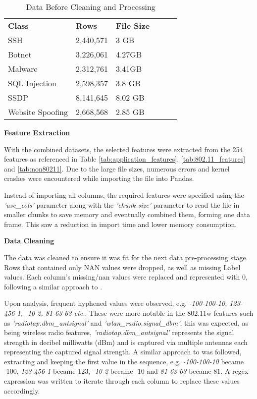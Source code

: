 \begin{table}[H]
\centering
\begin{tabular}{llllll}
\cline{1-3}
\textbf{Class}  & \textbf{Rows} & \textbf{File Size} &  &  &  \\ \cline{1-3}
SSH              & 2,440,571     & 3 GB               &  &  &  \\
Botnet           & 3,226,061     & 4.27GB             &  &  &  \\
Malware          & 2,312,761     & 3.41GB             &  &  &  \\
SQL Injection    & 2,598,357     & 3.8 GB             &  &  &  \\
SSDP             & 8,141,645     & 8.02 GB            &  &  &  \\
Website Spoofing & 2,668,568     & 2.85 GB            &  &  &  \\ \cline{1-3}
\end{tabular}
\caption{Data Before Cleaning and Processing}
\label{tab:full_data}
\end{table}

\medskip

\textbf{Feature Extraction}

\smallskip
With the combined datasets, the selected features were extracted from the 254 features as referenced in Table \ref{tab:application_features}, \ref{tab:802.11_features} and \ref{tab:non80211}. Due to the large file sizes, numerous errors and kernel crashes were encountered while importing the file into Pandas. 

Instead of importing all columns, the required features were specified using the \textit{'use\_cols'} parameter along with the \textit{'chunk size'} parameter to read the file in smaller chunks to save memory and eventually combined them, forming one data frame. This saw a reduction in import time and lower memory consumption.

\medskip
\textbf{Data Cleaning}

\smallskip
The data was cleaned to ensure it was fit for the next data pre-processing stage. Rows that contained only NAN values were dropped, as well as missing Label values. Each column's missing/nan values were replaced and represented with 0, following a similar approach to \textcite{s22155633}.

\smallskip
Upon analysis, frequent hyphened values were observed, e.g. \textit{-100-100-10, 123-456-1, -10-2, 81-63-63 etc.}. These were more notable in the 802.11w features such as \textit{'radiotap.dbm\_antsignal'} and \textit{'wlan\_radio.signal\_dbm'}, this was expected, as being wireless radio features, \textit{'radiotap.dbm\_antsignal'} represents the signal strength in decibel milliwatts (dBm) and is captured via multiple antennas each representing the captured signal strength. A similar approach to \parencite{s22155633} was followed, extracting and keeping the first value in the sequence, e.g. \textit{-100-100-10} became -100, \textit{123-456-1} became 123, \textit{-10-2} became -10 and \textit{81-63-63} became 81. A regex expression was written to iterate through each column to replace these values accordingly.

